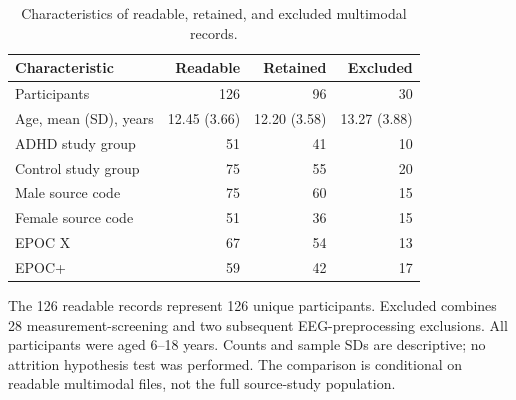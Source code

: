 \begin{table}[!htbp]
\centering\small
\caption{Characteristics of readable, retained, and excluded multimodal records.}
\label{tab:retention-profile}
\begin{tabular}{lrrr}
\toprule
Characteristic & Readable & Retained & Excluded\\
\midrule
Participants & 126 & 96 & 30\\
Age, mean (SD), years & 12.45 (3.66) & 12.20 (3.58) & 13.27 (3.88)\\
ADHD study group & 51 & 41 & 10\\
Control study group & 75 & 55 & 20\\
Male source code & 75 & 60 & 15\\
Female source code & 51 & 36 & 15\\
EPOC X & 67 & 54 & 13\\
EPOC+ & 59 & 42 & 17\\
\bottomrule
\end{tabular}
\par\smallskip\begin{minipage}{\textwidth}\footnotesize The 126 readable records represent 126 unique participants. Excluded combines 28 measurement-screening and two subsequent EEG-preprocessing exclusions. All participants were aged 6--18 years. Counts and sample SDs are descriptive; no attrition hypothesis test was performed. The comparison is conditional on readable multimodal files, not the full source-study population.
\end{minipage}
\end{table}
